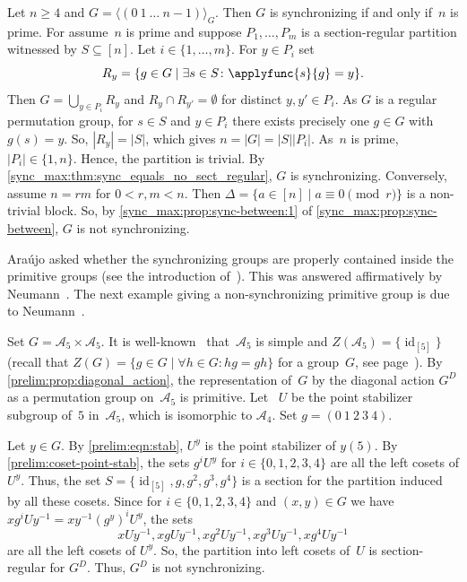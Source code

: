 \begin{example}
	Let $n \ge 4$
	and  $G = \langle (0 ~ 1 ~ \ldots ~ n - 1) \rangle_G$.
    Then $G$ is synchronizing if and only if~$n$ is prime.
	For assume~$n$ is prime
	and suppose $P_1, \ldots, P_m$ is a section-regular partition
	witnessed by $S \subseteq [n]$.
	Let $i \in \{1,\ldots,m\}$.
	For $y \in P_i$ 
	set 
	\[
	 R_y = \{ g \in G \mid \exists s \in S \colon \applyfunc{s}{g} = y \}.
	\]
	Then $G = \bigcup_{y \in P_i} R_y$
	and $R_y \cap R_{y'} = \emptyset$
	for distinct $y, y' \in P_i$.
	As $G$ is a regular permutation group, for $s \in S$ and $y \in P_i$
	there exists precisely one $g \in G$
	with $g(s) = y$.
	So, $|R_y| = |S|$, which
	gives $n = |G| = |S||P_i|$.
	As~$n$ is prime, $|P_i| \in \{1,n\}$.
	Hence, the partition is trivial.
	By \cref{sync_max:thm:sync_equals_no_sect_regular}, $G$ is synchronizing.
	Conversely, assume $n = rm$ for $0 < r,m < n$.
	Then $\Delta = \{ a \in [n] \mid a \equiv 0 \pmod{r} \}$
	is a non-trivial block.
	So, by \cref{sync_max:prop:sync-between:1} of \cref{sync_max:prop:sync-between}, $G$ 
	is not synchronizing.
\end{example}

Ara\'{u}jo asked whether the synchronizing groups are properly contained
inside the primitive groups (see the introduction of~\cite{Neumann09}).
This was answered affirmatively
by Neumann~\cite{Neumann09}.
The next example giving a non-synchronizing primitive group is due to Neumann~\cite[Ex.~3.3]{Neumann09}.

\begin{example}
\label{sync_max:ex:prim_not_sync}
 Set $G = \mathcal A_5 \times \mathcal A_5$.
 It is well-known~\cite{cameron_1999,dixon1996permutation}
 that~$\mathcal A_5$ is simple and $Z(\mathcal A_5) = \{ \operatorname{id}_{[5]} \}$
 (recall that 
 $Z(G) = \{ g \in G \mid \forall h \in G \colon hg = gh \}$
 for a group~$G$, see page~\pageref{def:center}).
 By \cref{prelim:prop:diagonal_action},
 the representation of~$G$ by the diagonal action $G^D$
 as a permutation group on~$\mathcal A_5$ is primitive.
 Let~ $U$ be the point stabilizer subgroup of~$5$ in~$\mathcal A_5$, which
 is isomorphic to $\mathcal A_4$.
 Set $g = (0 ~ 1 ~ 2 ~ 3 ~ 4)$.
 
 Let $y \in G$. By \cref{prelim:eqn:stab}, $U^y$ is the point stabilizer of $y(5)$.
 By \cref{prelim:coset-point-stab}, 
 the sets $g^i U^y$ for $i \in \{0,1,2,3,4\}$ are all the left cosets of $U^y$.
 Thus, the set $S = \{\operatorname{id}_{[5]}, g, g^2, g^3, g^4 \}$
 is a section for the partition induced by all these cosets.
 Since for $i \in \{0,1,2,3,4\}$ and $(x,y) \in G$ we have
 $xg^iUy^{-1} = xy^{-1} (g^y)^i U^y$, the sets
 \[
 x U y^{-1}, x gU y^{-1}, x g^2 U y^{-1}, x g^3 U y^{-1}, x g^4 U y^{-1}
 \]
 are all the left cosets of $U^y$.
 So, the partition into left cosets of~$U$
 is section-regular for $G^D$. Thus, $G^D$ is not synchronizing.
\end{example}

